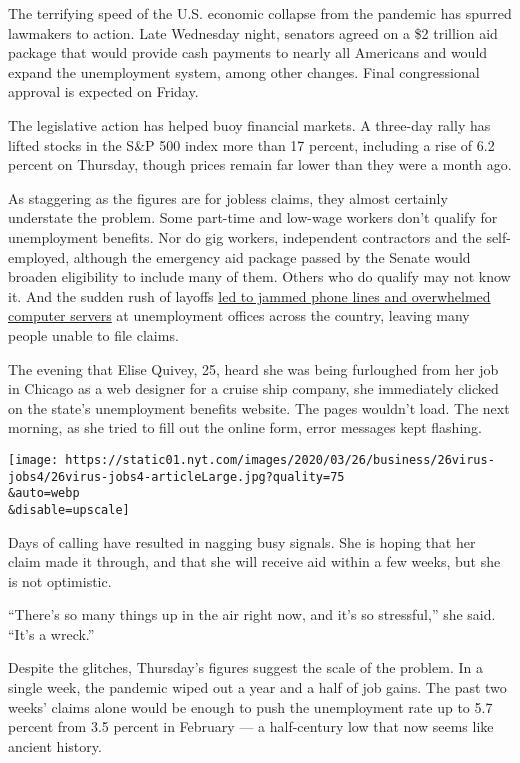 The terrifying speed of the U.S. economic collapse from the pandemic has
spurred lawmakers to action. Late Wednesday night, senators agreed on a
\$2 trillion aid package that would provide cash payments to nearly all
Americans and would expand the unemployment system, among other changes.
Final congressional approval is expected on Friday.

The legislative action has helped buoy financial markets. A three-day
rally has lifted stocks in the S\&P 500 index more than 17 percent,
including a rise of 6.2 percent on Thursday, though prices remain far
lower than they were a month ago.

As staggering as the figures are for jobless claims, they almost
certainly understate the problem. Some part-time and low-wage workers
don't qualify for unemployment benefits. Nor do gig workers, independent
contractors and the self-employed, although the emergency aid package
passed by the Senate would broaden eligibility to include many of them.
Others who do qualify may not know it. And the sudden rush of layoffs
\href{https://www.nytimes.com/2020/03/19/business/coronavirus-unemployment-states.html}{led
to jammed phone lines and overwhelmed computer servers} at unemployment
offices across the country, leaving many people unable to file claims.

The evening that Elise Quivey, 25, heard she was being furloughed from
her job in Chicago as a web designer for a cruise ship company, she
immediately clicked on the state's unemployment benefits website. The
pages wouldn't load. The next morning, as she tried to fill out the
online form, error messages kept flashing.

\texttt{[image: https://static01.nyt.com/images/2020/03/26/business/26virus-jobs4/26virus-jobs4-articleLarge.jpg?quality=75\\\&auto=webp\\\&disable=upscale]}

Days of calling have resulted in nagging busy signals. She is hoping
that her claim made it through, and that she will receive aid within a
few weeks, but she is not optimistic.

``There's so many things up in the air right now, and it's so
stressful,'' she said. ``It's a wreck.''

Despite the glitches, Thursday's figures suggest the scale of the
problem. In a single week, the pandemic wiped out a year and a half of
job gains. The past two weeks' claims alone would be enough to push the
unemployment rate up to 5.7 percent from 3.5 percent in February --- a
half-century low that now seems like ancient history.

